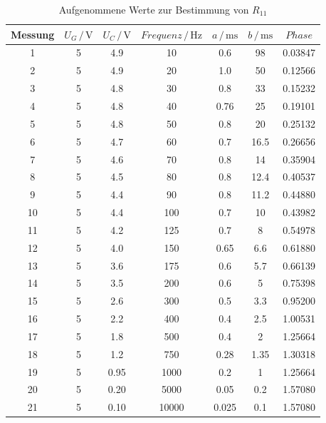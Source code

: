 \begin{table}[H]
\normalsize

\centering
{}
\begin{tabular}{c c c c c c c}
\toprule
        Messung & $U_G \,/\,\si{\volt}$ & $U_C \,/\,\si{\volt}$ & $Frequenz \,/\,\si{\hertz}$ & $a\,/\, \si{\milli\second}$ & $b\,/\, \si{\milli\second}$ & $Phase$ \\
        \midrule
        1   & 5 & 4.9 & 10 & 0.6 & 98 &     0.03847 \\
        2   & 5 & 4.9 & 20 & 1.0 & 50 &     0.12566 \\
        3   & 5 & 4.8 & 30  & 0.8 & 33 &    0.15232 \\ 
        4   & 5 & 4.8 & 40 & 0.76 & 25 &    0.19101 \\
        5   & 5 & 4.8 & 50 & 0.8 & 20 &     0.25132 \\
        6   & 5 & 4.7 & 60 & 0.7 & 16.5 &   0.26656 \\
        7   & 5 & 4.6 & 70 & 0.8 & 14 &     0.35904 \\
        8   & 5 & 4.5 & 80 & 0.8 & 12.4 &   0.40537 \\
        9   & 5 & 4.4 & 90 & 0.8 & 11.2 &   0.44880 \\
        10  & 5 & 4.4 & 100 & 0.7 & 10 &    0.43982 \\
        11  & 5 & 4.2 & 125 & 0.7 & 8 &     0.54978 \\
        12  & 5 & 4.0 & 150 & 0.65 & 6.6 &  0.61880 \\
        13  & 5 & 3.6 & 175 & 0.6 & 5.7 &   0.66139 \\
        14  & 5 & 3.5 & 200 & 0.6 & 5 &     0.75398 \\
        15  & 5 & 2.6 & 300 & 0.5 & 3.3 &   0.95200 \\
        16  & 5 & 2.2 & 400 & 0.4 & 2.5 &   1.00531 \\
        17  & 5 & 1.8 & 500 & 0.4 & 2 &     1.25664 \\
        18  & 5 & 1.2 & 750 & 0.28 & 1.35 & 1.30318 \\
        19  & 5 & 0.95 & 1000 & 0.2 & 1 &   1.25664 \\
        20  & 5 & 0.20 & 5000 & 0.05 & 0.2 & 1.57080 \\
        21  & 5 & 0.10& 10000 & 0.025 & 0.1 & 1.57080 \\



        
\bottomrule

\end{tabular}

\caption{Aufgenommene Werte zur Bestimmung von $R_{11}$}
\label{tab:1}
\end{table}